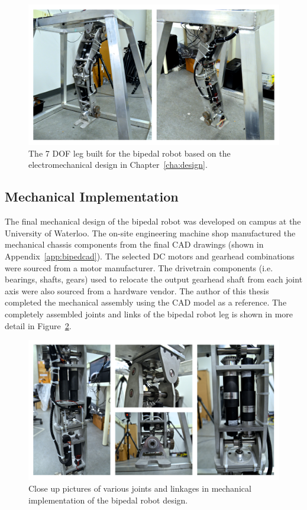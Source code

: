\begin{figure}[!h]
	\centering
    \includegraphics[scale=0.39]{fig/hardware/bipedleg.png} 
  	\caption{The 7 DOF leg built for the bipedal robot based on the electromechanical design in Chapter~\ref{cha:design}.}
	\label{fig:bipedleg}
\end{figure}

\subsection{Mechanical Implementation} %
\label{sub:mechanical_implementation}

The final mechanical design of the bipedal robot was developed on campus at the University of Waterloo. The on-site engineering machine shop manufactured the mechanical chassis components from the final CAD drawings (shown in Appendix~\ref{app:bipedcad}). The selected DC motors and gearhead combinations were sourced from a motor manufacturer. The drivetrain components (i.e. bearings, shafts, gears) used to relocate the output gearhead shaft from each joint axis were also sourced from a hardware vendor. The author of this thesis completed the mechanical assembly using the CAD model as a reference. The completely assembled joints and links of the bipedal robot leg is shown in more detail in Figure~\ref{fig:bipedcloseup}.

\begin{figure}[!h]
	\centering
    \includegraphics[scale=0.38]{fig/hardware/bipedcloseup.png} 
  	\caption{Close up pictures of various joints and linkages in mechanical implementation of the bipedal robot design.}
	\label{fig:bipedcloseup}
\end{figure}

